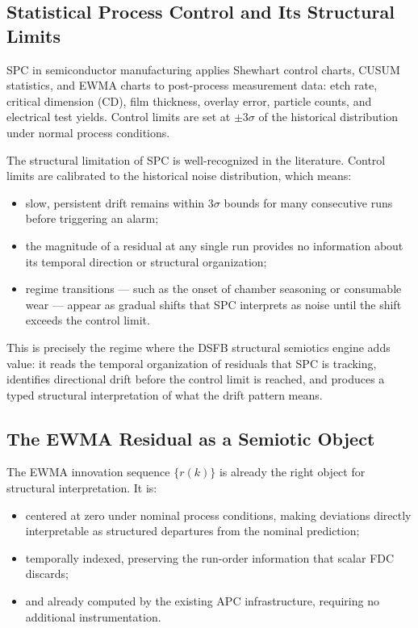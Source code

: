 \documentclass[11pt,letterpaper]{article}
\theoremstyle{scresult}
\begin{document}
\subsection{Statistical Process Control and Its Structural Limits}

SPC in semiconductor manufacturing applies Shewhart control charts, CUSUM
statistics, and EWMA charts to post-process measurement data: etch rate,
critical dimension (CD), film thickness, overlay error, particle counts, and
electrical test yields. Control limits are set at $\pm 3\sigma$ of the
historical distribution under normal process conditions.

The structural limitation of SPC is well-recognized in the literature. Control
limits are calibrated to the historical noise distribution, which means:
\begin{itemize}
  \item slow, persistent drift remains within $3\sigma$ bounds for many
        consecutive runs before triggering an alarm;
  \item the magnitude of a residual at any single run provides no information
        about its temporal direction or structural organization;
  \item regime transitions --- such as the onset of chamber seasoning or
        consumable wear --- appear as gradual shifts that SPC interprets as
        noise until the shift exceeds the control limit.
\end{itemize}

This is precisely the regime where the DSFB structural semiotics engine adds
value: it reads the temporal organization of residuals that SPC is tracking,
identifies directional drift before the control limit is reached, and produces
a typed structural interpretation of what the drift pattern means.

\subsection{The EWMA Residual as a Semiotic Object}

The EWMA innovation sequence $\{r(k)\}$ is already the right object for
structural interpretation. It is:
\begin{itemize}
  \item centered at zero under nominal process conditions, making deviations
        directly interpretable as structured departures from the nominal
        prediction;
  \item temporally indexed, preserving the run-order information that scalar
        FDC discards;
  \item and already computed by the existing APC infrastructure, requiring
        no additional instrumentation.
\end{itemize}
\end{document}
